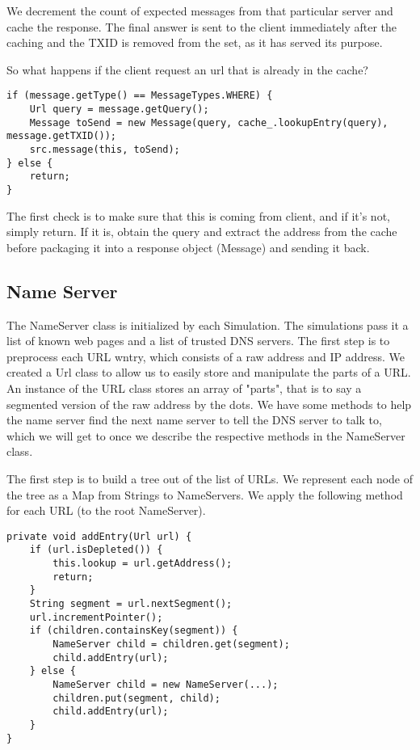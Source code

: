 \documentclass[a4paper, 12pt]{article} %
\begin{document}
We decrement the count of expected messages from that particular server and cache the response. The final answer is sent to the client immediately after the caching and the TXID is removed from the set, as it has served its purpose.

So what happens if the client request an url that is already in the cache?

\begin{lstlisting}
if (message.getType() == MessageTypes.WHERE) {
    Url query = message.getQuery();
    Message toSend = new Message(query, cache_.lookupEntry(query), message.getTXID());
    src.message(this, toSend);
} else {
    return;
}
\end{lstlisting}

The first check is to make sure that this is coming from  client, and if it’s not, simply return. If it is, obtain the query and extract the address from the cache before packaging it into a response object (Message) and sending it back.

\subsection*{Name Server}

The NameServer class is initialized by each Simulation. The simulations pass it a list of known web pages and a list of trusted DNS servers. The first step is to preprocess each URL wntry, which consists of a raw address and IP address. We created a Url class to allow us to easily store and manipulate the parts of a URL. An instance of the URL class stores an array of "parts", that is to say a segmented version of the raw address by the dots. We have some methods to help the name server find the next name server to tell the DNS server to talk to, which we will get to once we describe the respective methods in the NameServer class.

The first step is to build a tree out of the list of URLs. We represent each node of the tree as a Map from Strings to NameServers. We apply the following method for each URL (to the root NameServer).

\begin{lstlisting}
private void addEntry(Url url) {
    if (url.isDepleted()) {
        this.lookup = url.getAddress();
        return;
    }
    String segment = url.nextSegment();
    url.incrementPointer();
    if (children.containsKey(segment)) {
        NameServer child = children.get(segment);
        child.addEntry(url);
    } else {
        NameServer child = new NameServer(...);
        children.put(segment, child);
        child.addEntry(url);
    }
}
\end{lstlisting}
\end{document}
